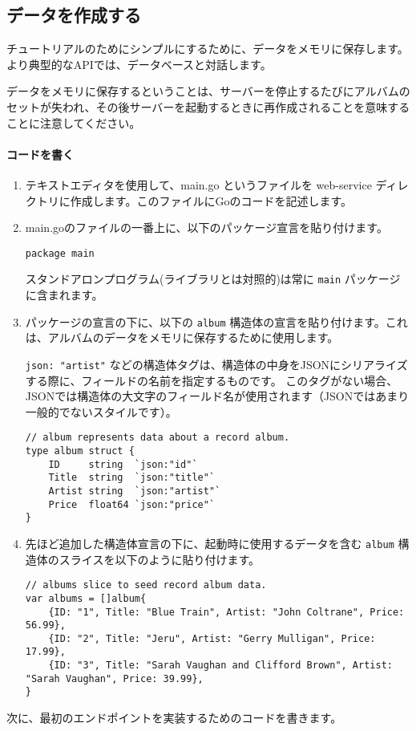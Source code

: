 
\subsection{データを作成する}

チュートリアルのためにシンプルにするために、データをメモリに保存します。より典型的なAPIでは、データベースと対話します。

データをメモリに保存するということは、サーバーを停止するたびにアルバムのセットが失われ、その後サーバーを起動するときに再作成されることを意味することに注意してください。

\paragraph{コードを書く}

\begin{enumerate}
\item
  テキストエディタを使用して、main.go というファイルを web-service
  ディレクトリに作成します。このファイルにGoのコードを記述します。
\item
  main.goのファイルの一番上に、以下のパッケージ宣言を貼り付けます。

\begin{lstlisting}[numbers=none]
package main
\end{lstlisting}



  スタンドアロンプログラム(ライブラリとは対照的)は常に \texttt{main}
  パッケージに含まれます。
\item
  パッケージの宣言の下に、以下の \texttt{album}
  構造体の宣言を貼り付けます。これは、アルバムのデータをメモリに保存するために使用します。

  \texttt{json:\ "artist"}
  などの構造体タグは、構造体の中身をJSONにシリアライズする際に、フィールドの名前を指定するものです。
  このタグがない場合、JSONでは構造体の大文字のフィールド名が使用されます（JSONではあまり一般的でないスタイルです）。

\begin{lstlisting}[numbers=none]
// album represents data about a record album.
type album struct {
    ID     string  `json:"id"`
    Title  string  `json:"title"`
    Artist string  `json:"artist"`
    Price  float64 `json:"price"`
}
\end{lstlisting}
\item
  先ほど追加した構造体宣言の下に、起動時に使用するデータを含む
  \texttt{album} 構造体のスライスを以下のように貼り付けます。

\begin{lstlisting}[numbers=none]
// albums slice to seed record album data.
var albums = []album{
    {ID: "1", Title: "Blue Train", Artist: "John Coltrane", Price: 56.99},
    {ID: "2", Title: "Jeru", Artist: "Gerry Mulligan", Price: 17.99},
    {ID: "3", Title: "Sarah Vaughan and Clifford Brown", Artist: "Sarah Vaughan", Price: 39.99},
}
\end{lstlisting}
\end{enumerate}

次に、最初のエンドポイントを実装するためのコードを書きます。

